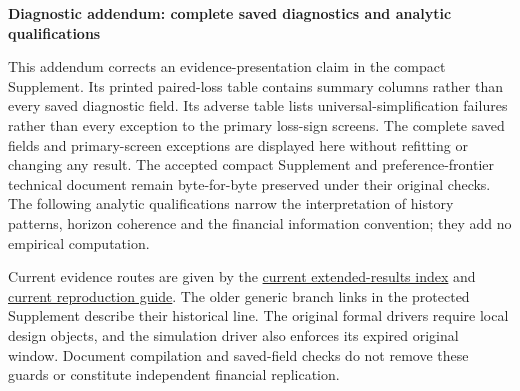 \documentclass[11pt,a4paper]{article}
\begin{document}
\begin{center}\Large\bfseries Diagnostic addendum: complete saved diagnostics and analytic qualifications\end{center}
This addendum corrects an evidence-presentation claim in the compact Supplement. Its printed paired-loss table contains summary columns rather than every saved diagnostic field. Its adverse table lists universal-simplification failures rather than every exception to the primary loss-sign screens. The complete saved fields and primary-screen exceptions are displayed here without refitting or changing any result. The accepted compact Supplement and preference-frontier technical document remain byte-for-byte preserved under their original checks. The following analytic qualifications narrow the interpretation of history patterns, horizon coherence and the financial information convention; they add no empirical computation.

Current evidence routes are given by the \href{https://github.com/ByronLi0207/financial-mathematics-paper-20261020/blob/revision-v8-goal/EXTENDED_RESULTS.md}{current extended-results index} and \href{https://github.com/ByronLi0207/financial-mathematics-paper-20261020/blob/revision-v8-goal/notes/revision-v9/REPRODUCING.md}{current reproduction guide}. The older generic branch links in the protected Supplement describe their historical line. The original formal drivers require local design objects, and the simulation driver also enforces its expired original window. Document compilation and saved-field checks do not remove these guards or constitute independent financial replication.


\clearpage

\end{document}
